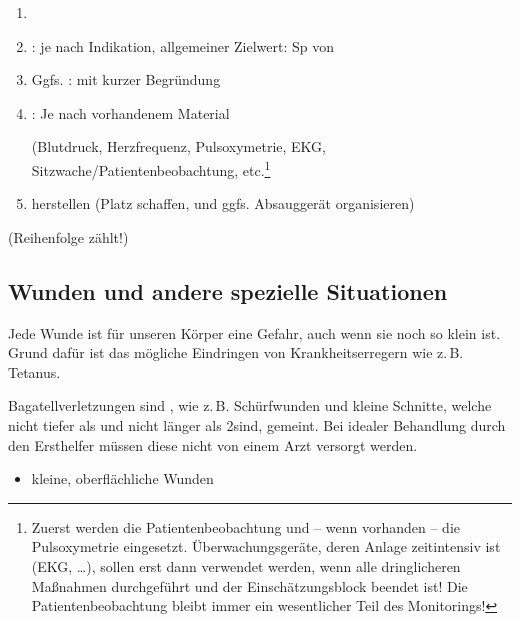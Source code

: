 {{\begin{enumerate}
  \item {}
  \item {}: je nach Indikation,
  allgemeiner Zielwert: Sp von \PC*
  \item Ggfs. :
  mit kurzer Begründung
  
  \item {}: Je nach
  vorhandenem Material
  
  (Blutdruck, Herzfrequenz, Pulsoxymetrie, EKG,
  Sitzwache/Patientenbeobachtung, etc.\footnote{Zuerst werden die Patientenbeobachtung
  und -- wenn vorhanden -- die
  Pulsoxymetrie eingesetzt. Überwachungsgeräte, deren Anlage
  zeitintensiv ist (EKG, \ldots), sollen erst dann verwendet
  werden, wenn alle dringlicheren Maßnahmen durchgeführt und
  der Einschätzungsblock beendet ist! Die
  Patientenbeobachtung bleibt immer ein wesentlicher Teil
  des Monitorings!}
  \item {} herstellen
  (Platz schaffen,  und ggfs.
  Absauggerät organisieren)
\end{enumerate}



{\scriptsize(Reihenfolge zählt!)}
}

}

\subsection{Wunden und andere spezielle Situationen}
\label{topic:wunden-ehi}


Jede Wunde ist für unseren Körper eine Gefahr, auch wenn sie noch so klein
ist. Grund dafür ist das mögliche Eindringen von Krankheitserregern wie z.\,B.
Tetanus. 

{%
Bagatellverletzungen sind , wie z.\,B. Schürfwunden und kleine Schnitte, welche
nicht tiefer als \CM* und nicht länger als
2\CM* sind, gemeint. Bei idealer Behandlung durch den
Ersthelfer müssen diese nicht von einem Arzt versorgt
werden.
}{
\begin{itemize}
  \item kleine, oberflächliche Wunden
\end{itemize}
}{}{}{}


